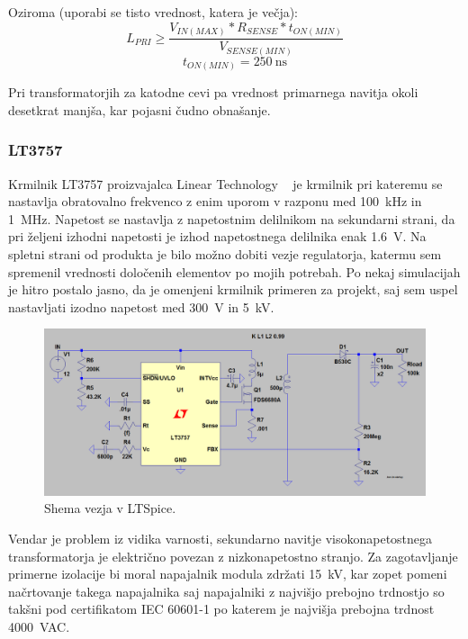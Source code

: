 \documentclass[a4paper,twoside,openright,12pt,slovene]{book}
\begin{document}
Oziroma (uporabi se tisto vrednost, katera je večja):
\[L_{PRI} \geq \frac{V_{IN(MAX)}*R_{SENSE}*t_{ON(MIN)}}{V_{SENSE(MIN)}}\]
\[t_{ON(MIN)}=\SI{250}{\nano\second}\]

Pri transformatorjih za katodne cevi pa vrednost primarnega navitja okoli desetkrat manjša, kar pojasni čudno obnašanje.

	\subsubsection{LT3757} \label{LT3757}
Krmilnik LT3757 proizvajalca Linear Technology ~\cite{analog:LT3757} je krmilnik pri kateremu se nastavlja obratovalno frekvenco z enim uporom v razponu med \SI{100} {\kilo\hertz} in \SI{1} {\mega\hertz}. Napetost se nastavlja z napetostnim delilnikom na sekundarni strani, da pri željeni izhodni napetosti je izhod napetostnega delilnika enak \SI{1.6} {\volt}. Na spletni strani od produkta je bilo možno dobiti vezje regulatorja, katermu sem spremenil vrednosti določenih elementov po mojih potrebah. Po nekaj simulacijah je hitro postalo jasno, da je omenjeni krmilnik primeren za projekt, saj sem uspel nastavljati izodno napetost med \SI{300}{\volt} in \SI{5}{\kilo\volt}. 

    \begin{figure}[H]
        \centering
        \includegraphics[width=1\columnwidth]{Slike/Simulacije/LM3757spice.png}
        \caption{\label{LM3757spice} Shema vezja v LTSpice.}
    \end{figure}
    
Vendar je problem iz vidika varnosti, sekundarno navitje visokonapetostnega transformatorja je električno povezan z nizkonapetostno stranjo. Za zagotavljanje primerne izolacije bi moral napajalnik modula zdržati \SI{15}{\kilo\volt}, kar zopet pomeni načrtovanje takega napajalnika saj napajalniki z najvišjo prebojno trdnostjo so takšni pod certifikatom IEC 60601-1 po katerem je najvišja prebojna trdnost \SI{4000}{\volt}AC.
\end{document}
